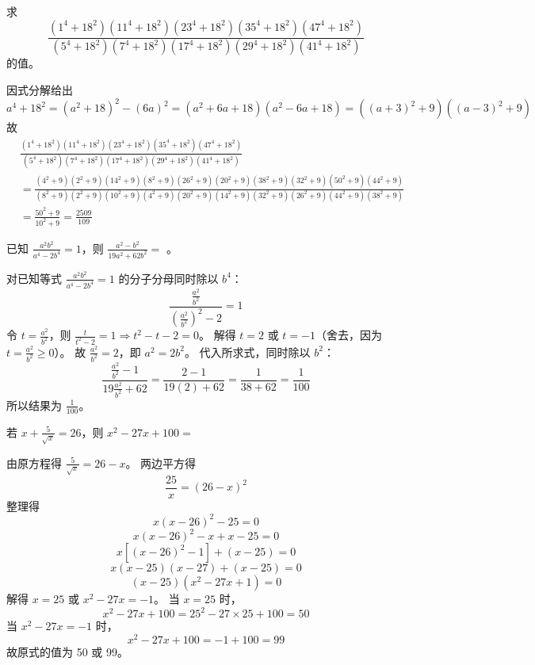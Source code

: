 \begin{questions}
    \question 求 
    \[
    \frac{(1^{4}+18^{2})(11^{4}+18^{2})(23^{4}+18^{2})(35^{4}+18^{2})(47^{4}+18^{2})}{(5^{4}+18^{2})(7^{4}+18^{2})(17^{4}+18^{2})(29^{4}+18^{2})(41^{4}+18^{2})}
    \] 
    的值。
    \begin{solution}
        因式分解给出
        \[
        a^4+18^2=(a^2+18)^2-(6a)^2=(a^2+6a+18)(a^2-6a+18)=((a+3)^2+9)((a-3)^2+9)
        \] 
        故
        \begin{align*}
        &\frac{(1^{4}+18^{2})(11^{4}+18^{2})(23^{4}+18^{2})(35^{4}+18^{2})(47^{4}+18^{2})}{(5^{4}+18^{2})(7^{4}+18^{2})(17^{4}+18^{2})(29^{4}+18^{2})(41^{4}+18^{2})}\\
        &=\frac{(4^2+9)(2^2+9)(14^2+9)(8^2+9)(26^2+9)(20^2+9)(38^2+9)(32^2+9)(50^2+9)(44^2+9)}{(8^2+9)(2^2+9)(10^2+9)(4^2+9)(20^2+9)(14^2+9)(32^2+9)(26^2+9)(44^2+9)(38^2+9)} \\
        &=\frac{50^2+9}{10^2+9}=\frac{2509}{109}
        \end{align*}
    \end{solution}

    \question 已知 $\frac{a^2b^2}{a^4 - 2b^4} = 1$，则 $\frac{a^2 - b^2}{19a^2 + 62b^2} =$ \underline{\hspace{1cm}}。

\begin{solution}
对已知等式 $\frac{a^2b^2}{a^4 - 2b^4} = 1$ 的分子分母同时除以 $b^4$：
\[
\frac{\frac{a^2}{b^2}}{\left(\frac{a^2}{b^2}\right)^2 - 2} = 1
\]
令 $t = \frac{a^2}{b^2}$，则 $\frac{t}{t^2 - 2} = 1 \Rightarrow t^2 - t - 2 = 0$。
解得 $t = 2$ 或 $t = -1$（舍去，因为 $t = \frac{a^2}{b^2} \ge 0$）。
故 $\frac{a^2}{b^2} = 2$，即 $a^2 = 2b^2$。
代入所求式，同时除以 $b^2$：
\[
\frac{\frac{a^2}{b^2} - 1}{19\frac{a^2}{b^2} + 62} = \frac{2 - 1}{19(2) + 62} = \frac{1}{38 + 62} = \frac{1}{100}
\]
所以结果为 $\frac{1}{100}$。
\end{solution}

\question
若 $x + \frac{5}{\sqrt{x}} = 26$，则 $x^2 - 27x + 100 =$

\begin{solution}
由原方程得 $\frac{5}{\sqrt{x}} = 26 - x$。
两边平方得
\[
\frac{25}{x} = (26 - x)^2
\]
整理得
\[
x(x - 26)^2 - 25 = 0
\]
\[
x(x - 26)^2 - x + x - 25 = 0
\]
\[
x\left[ (x - 26)^2 - 1 \right] + (x - 25) = 0
\]
\[
x(x - 25)(x - 27) + (x - 25) = 0
\]
\[
(x - 25)(x^2 - 27x + 1) = 0
\]
解得 $x = 25$ 或 $x^2 - 27x = -1$。
当 $x = 25$ 时，
\[
x^2 - 27x + 100 = 25^2 - 27 \times 25 + 100 = 50
\]
当 $x^2 - 27x = -1$ 时，
\[
x^2 - 27x + 100 = -1 + 100 = 99
\]
故原式的值为 50 或 99。
\end{solution}


\end{questions}
